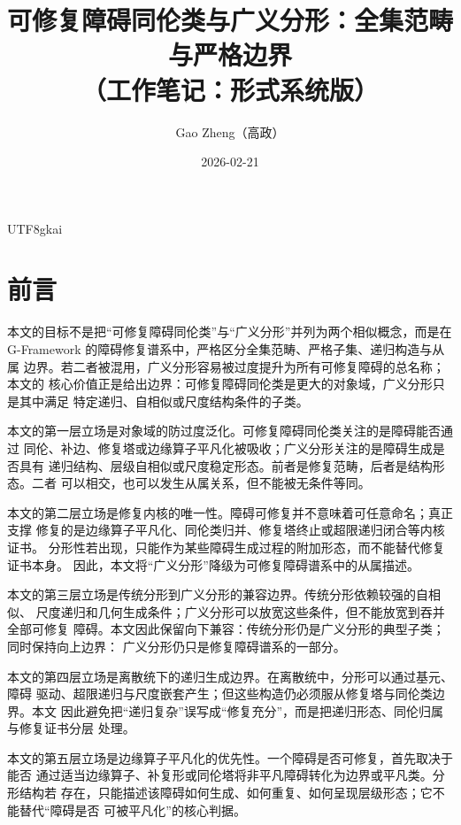 \documentclass[12pt]{article}
\newcommand{\GFramework}{\textsf{G-Framework}}
\begin{document}
\begin{CJK*}{UTF8}{gkai}

\title{可修复障碍同伦类与广义分形：全集范畴与严格边界\\（工作笔记：形式系统版）}
\author{Gao Zheng（高政）}
\date{2026-02-21}
\maketitle

\section*{前言}

本文的目标不是把“可修复障碍同伦类”与“广义分形”并列为两个相似概念，而是在
\GFramework{} 的障碍修复谱系中，严格区分全集范畴、严格子集、递归构造与从属
边界。若二者被混用，广义分形容易被过度提升为所有可修复障碍的总名称；本文的
核心价值正是给出边界：可修复障碍同伦类是更大的对象域，广义分形只是其中满足
特定递归、自相似或尺度结构条件的子类。

本文的第一层立场是对象域的防过度泛化。可修复障碍同伦类关注的是障碍能否通过
同伦、补边、修复塔或边缘算子平凡化被吸收；广义分形关注的是障碍生成是否具有
递归结构、层级自相似或尺度稳定形态。前者是修复范畴，后者是结构形态。二者
可以相交，也可以发生从属关系，但不能被无条件等同。

本文的第二层立场是修复内核的唯一性。障碍可修复并不意味着可任意命名；真正支撑
修复的是边缘算子平凡化、同伦类归并、修复塔终止或超限递归闭合等内核证书。
分形性若出现，只能作为某些障碍生成过程的附加形态，而不能替代修复证书本身。
因此，本文将“广义分形”降级为可修复障碍谱系中的从属描述。

本文的第三层立场是传统分形到广义分形的兼容边界。传统分形依赖较强的自相似、
尺度递归和几何生成条件；广义分形可以放宽这些条件，但不能放宽到吞并全部可修复
障碍。本文因此保留向下兼容：传统分形仍是广义分形的典型子类；同时保持向上边界：
广义分形仍只是修复障碍谱系的一部分。

本文的第四层立场是离散统下的递归生成边界。在离散统中，分形可以通过基元、障碍
驱动、超限递归与尺度嵌套产生；但这些构造仍必须服从修复塔与同伦类边界。本文
因此避免把“递归复杂”误写成“修复充分”，而是把递归形态、同伦归属与修复证书分层
处理。

本文的第五层立场是边缘算子平凡化的优先性。一个障碍是否可修复，首先取决于能否
通过适当边缘算子、补复形或同伦塔将非平凡障碍转化为边界或平凡类。分形结构若
存在，只能描述该障碍如何生成、如何重复、如何呈现层级形态；它不能替代“障碍是否
可被平凡化”的核心判据。


\end{CJK*}
\end{document}
